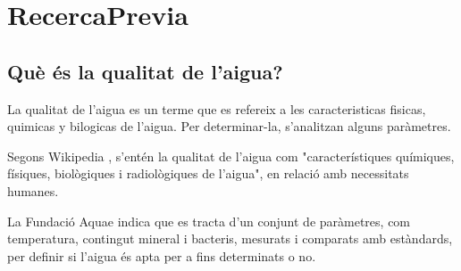 \chapter{RecercaPrevia}

\section{Què és la qualitat de l’aigua?}
La qualitat de l'aigua es un terme que es refereix a les caracteristicas fisicas, quimicas y bilogicas de l'aigua. Per determinar-la, s'analitzan alguns paràmetres.

Segons Wikipedia \cite{WikiAgua}, s'entén la qualitat de l'aigua com "característiques químiques, físiques, biològiques i radiològiques de l'aigua", en relació amb necessitats humanes.

La Fundació Aquae \cite{Fundacionaquae} indica que es tracta d'un conjunt de paràmetres, com temperatura, contingut mineral i bacteris, mesurats i comparats amb estàndards, per definir si l'aigua és apta per a fins determinats o no.
